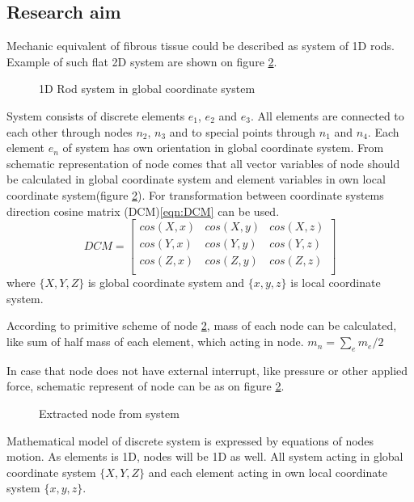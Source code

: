 \subsection*{Research aim}
Mechanic equivalent of fibrous tissue could be described as system of 1D rods.
Example of such flat 2D system are shown on figure \ref{fig:nodeExtract}.
\begin{figure}[H]
  \centering
      
  \caption{1D Rod system in global coordinate system}\label{fig:rodSystem}      
\end{figure} 
System consists of discrete elements $e_1$, $e_2$ and $e_3$. All elements are
connected to each other through nodes $n_2$, $n_3$ and to special points through
$n_1$ and $n_4$. Each element $e_n$ of system has own orientation in global
coordinate system. 
From schematic representation of node comes that all vector variables of node should be calculated
 in global coordinate system and element variables in own local coordinate system(figure
 \ref{fig:nodeExtract}). For transformation between coordinate systems direction cosine matrix
 (DCM)\eqref{eqn:DCM} can be used.
\begin{equation}\label{eqn:DCM}
  DCM= \begin{bmatrix}
    cos(X,x)&cos(X,y)&cos(X,z)\\
    cos(Y,x)&cos(Y,y)&cos(Y,z)\\
    cos(Z,x)&cos(Z,y)&cos(Z,z)\\
   \end{bmatrix} 
\end{equation}
where $\{X, Y, Z\}$ is global coordinate system and $\{x,y,z\}$ is local coordinate
system.\par According to primitive scheme of node \ref{fig:nodeExtract}, mass of
each node can be calculated, like sum of half mass of each element, which acting
in node. $m_n=\sum_{e}m_e/2$\par
In case that node does not have external interrupt, like pressure or other
 applied force, schematic represent of node can be as on figure
 \ref{fig:nodeExtract}.\par
\begin{figure}[H]
  \centering
      
  \caption{Extracted node from system}\label{fig:nodeExtract}
\end{figure}
Mathematical model of discrete system is expressed by equations of nodes motion.
As elements is 1D, nodes will be 1D as well. All system acting in global
coordinate system $\{X, Y, Z\}$ and each element acting in own local coordinate
system $\{x,y,z\}$.